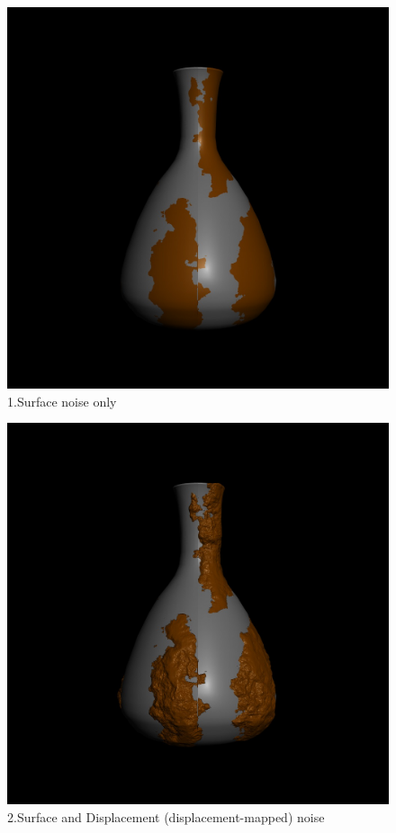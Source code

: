 \documentclass[12pt,letterpaper]{article}
\begin{document}
\begin{figure}[p]
    \centering
    \includegraphics[width=1.\textwidth]{lab2_noise.jpg}
    \caption{1.Surface noise only}
\end{figure}

\begin{figure}[p]
    \centering
    \includegraphics[width=1.\textwidth]{lab2_dis.jpg}
    \caption{2.Surface and Displacement (displacement-mapped) noise}
\end{figure}
\end{document}
